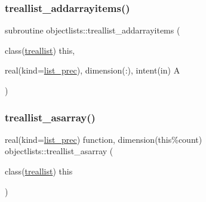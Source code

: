 \mbox{\label{namespaceobjectlists_ae3cae7b25174f6f119f19e9c5f44dc44}} 
\subsubsection{\texorpdfstring{treallist\+\_\+addarrayitems()}{treallist\_addarrayitems()}}
{\footnotesize\ttfamily subroutine objectlists\+::treallist\+\_\+addarrayitems (\begin{DoxyParamCaption}\item[{class(\mbox{\hyperlink{structobjectlists_1_1treallist}{treallist}})}]{this,  }\item[{real(kind=\mbox{\hyperlink{namespaceobjectlists_a9d176bc6347eefeceba8cb520c6be81c}{list\+\_\+prec}}), dimension(\+:), intent(in)}]{A }\end{DoxyParamCaption})\hspace{0.3cm}{\ttfamily [private]}}

\mbox{\label{namespaceobjectlists_a06b8548c6daa95a52c2c3d2a3fe587dc}} 
\subsubsection{\texorpdfstring{treallist\+\_\+asarray()}{treallist\_asarray()}}
{\footnotesize\ttfamily real(kind=\mbox{\hyperlink{namespaceobjectlists_a9d176bc6347eefeceba8cb520c6be81c}{list\+\_\+prec}}) function, dimension(this\%count) objectlists\+::treallist\+\_\+asarray (\begin{DoxyParamCaption}\item[{class(\mbox{\hyperlink{structobjectlists_1_1treallist}{treallist}})}]{this }\end{DoxyParamCaption})\hspace{0.3cm}{\ttfamily [private]}}

\mbox{\label{namespaceobjectlists_a7f2de098afb2605d8dccf08bd7daca10}} 
